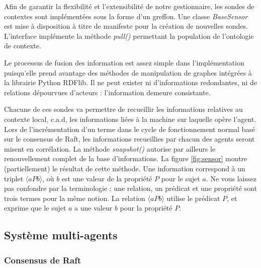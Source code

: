 Afin de garantir la flexibilité et l'extensibilité de notre gestionnaire, les
sondes de contextes sont implémentées sous la forme d'un greffon. Une classe
\emph{BaseSensor} est mise à disposition à titre de manifeste pour la création
de nouvelles sondes. L'interface implémente la méthode \emph{pull()} permettant
la population de l'ontologie de contexte.

Le processus de fusion des information est assez simple dans l'implémentation
puisqu'elle prend avantage des méthodes de manipulation de graphes intégrées à
la librairie Python RDFlib. Il ne peut exister ni d'informations redondantes, ni
de relations dépourvues d'acteurs : l'information demeure consistante.

Chacune de ces sondes va permettre de recueillir les informations relatives au
contexte local, c.a.d, les informations liées à la machine sur laquelle opère
l'agent. Lors de l'incrémentation d'un terme dans le cycle de fonctionnement
normal basé sur le consensus de Raft, les informations recueillies par chacun
des agents seront misent en corrélation. La méthode \emph{snapshot()} autorise
par ailleurs le renouvellement complet de la base d'informations.  La figure
\ref{fig:sensor} montre (partiellement) le résultat de cette méthode.  Une
information correspond à un triplet $\langle a P b \rangle$, où $b$ est une
valeur de la propriété $P$ pour le sujet $a$. Ne vous laissez pas confondre par
la terminologie : une relation, un prédicat et une propriété sont trois termes
pour la même notion. La relation $\langle a P b \rangle$ utilise le prédicat
$P$, et exprime que le sujet $a$ a une valeur $b$ pour la propriété $P$.

\subsection{Système multi-agents}

\subsubsection{Consensus de Raft}

